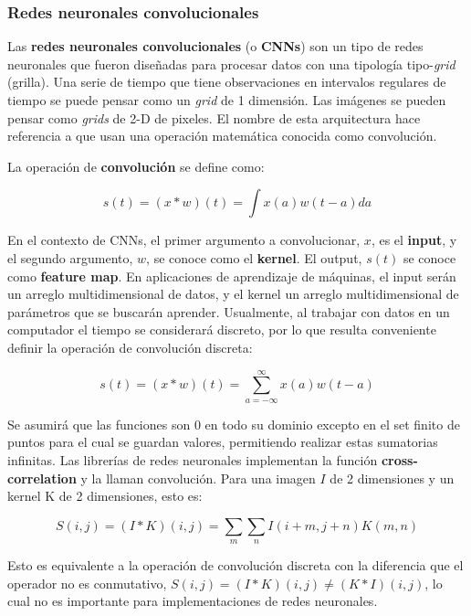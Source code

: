 \subsubsection{Redes neuronales convolucionales}

Las \textbf{redes neuronales convolucionales} (o \textbf{CNNs}) son un tipo de redes neuronales que fueron dise{\~{n}}adas para procesar datos con una tipolog\'ia tipo-\textit{grid} (grilla). Una serie de tiempo que tiene observaciones en intervalos regulares de tiempo se puede pensar como un \textit{grid} de 1 dimensi\'on. Las im\'agenes se pueden pensar como \textit{grids} de 2-D de pixeles. El nombre de esta arquitectura hace referencia a que usan una operaci\'on matem\'atica conocida como convoluci\'on.

La operaci\'on de \textbf{convoluci\'on} se define como:

\begin{equation}
s(t) = (x * w)(t) = \int x(a)w(t-a)da
\end{equation}

En el contexto de CNNs, el primer argumento a convolucionar, $x$, es el \textbf{input}, y el segundo argumento, $w$, se conoce como el \textbf{kernel}. El output, $s(t)$ se conoce como \textbf{feature map}. En aplicaciones de aprendizaje de m\'aquinas, el input ser\'an un arreglo multidimensional de datos, y el kernel un arreglo multidimensional de par\'ametros que se buscar\'an aprender. Usualmente, al trabajar con datos en un computador el tiempo se considerar\'a discreto, por lo que resulta conveniente definir la operaci\'on de convoluci\'on discreta:

\begin{equation}
s(t) = (x * w)(t) = \sum_{a=-\infty}^{\infty} x(a)w(t-a)
\end{equation}

Se asumir\'a que las funciones son 0 en todo su dominio excepto en el set finito de puntos para el cual se guardan valores, permitiendo realizar estas sumatorias infinitas. Las librer\'ias de redes neuronales implementan la funci\'on \textbf{cross-correlation} y la llaman convoluci\'on. Para una imagen $I$ de 2 dimensiones y un kernel K de 2 dimensiones, esto es: 

\begin{equation}
S(i,j) = (I * K)(i,j) = \sum_{m}\sum_{n} I(i+m,j+n)K(m,n)
\end{equation}

Esto es equivalente a la operaci\'on de convoluci\'on discreta con la diferencia que el operador no es conmutativo, $S(i,j) = (I * K)(i,j) \neq (K * I)(i,j)$, lo cual no es importante para implementaciones de redes neuronales. 

